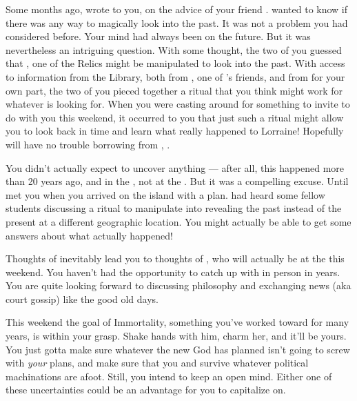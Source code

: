 \documentclass[char]{GL2020}
\begin{document}
Some months ago, \cHeir{\full} wrote to you, on the advice of your friend \cLibrarian{}. \cHeir{} wanted to know if there was any way to magically look into the past. It was not a problem you had considered before. Your mind had always been on the future. But it was nevertheless an intriguing question. With some thought, the two of you guessed that \iMirror{}, one of the \pTech{} Relics might be manipulated to look into the past. With access to information from the Library, both from \cPresident{}, one of \cHeir{}’s friends, and from \cLibrarian{} for your own part, the two of you pieced together a ritual that you think might work for whatever \cHeir{} is looking for. When you were casting around for something to invite \cChupStudent{} to do with you this weekend, it occurred to you that just such a ritual might allow you to look back in time and learn what really happened to Lorraine! Hopefully \cHeir{} will have no trouble borrowing \iMirror{} from \cHeir{\their} \cDiplomat{\auncle}, \cDiplomat{\full}.

You didn’t actually expect to uncover anything — after all, this happened more than 20 years ago, and in the \pFarm{}, not at the \pSchool{}. But it was a compelling excuse. Until \cChupStudent{} met you when you arrived on the island with a plan. \cChupStudent{\They} had heard some fellow students discussing a ritual to manipulate \iMirror{} into revealing the past instead of the present at a different geographic location. You might actually be able to get some answers about what actually happened!

Thoughts of \cWildCardFriend{} inevitably lead you to thoughts of \cHedonist{}, who will actually be at the \pSchool{} this weekend. You haven’t had the opportunity to catch up with \cHedonist{} in person in years. You are quite looking forward to discussing philosophy and exchanging news (aka court gossip) like the good old days.


This weekend the goal of Immortality, something you’ve worked toward for many years, is within your grasp. Shake hands with him, charm her, and it’ll be yours. You just gotta make sure whatever the new God has planned isn’t going to screw with \emph{your} plans, and make sure that you and \cDisney{} survive whatever political machinations are afoot. Still, you intend to keep an open mind. Either one of these uncertainties could be an advantage for you to capitalize on.
\end{document}
